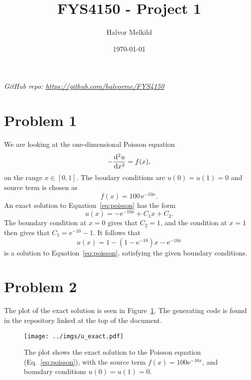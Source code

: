 \documentclass[english,notitlepage,aps,pra,10pt]{revtex4-2}
\newcommand{\e}{\mathrm{e}}
\begin{document}
\title{FYS4150 - Project 1}      %
\author{Halvor Melkild}          %
\date{\today}                             %
\noaffiliation                            %


\maketitle

\textit{GitHub repo: \href{https://github.com/halvorme/FYS4150/}{https://github.com/halvorme/FYS4150}}

\section*{Problem 1}

We are looking at the one-dimensional Poisson equation 
\begin{equation}
    -\dv[2]{u}{x} = f(x),
    \label{eq:poisson}
\end{equation}
on the range $x \in [0,1]$. The boudary conditions are $u(0) = u(1) = 0$ and source term is chosen as 
\begin{equation}
    f(x) = 100\, \e^{-10x}.
\end{equation}
An exact solution to Equation~\ref{eq:poisson} has the form 
\begin{equation}
    u(x) = -\e^{-10x} + C_1 x + C_2.
\end{equation}
The boundary condition at $x=0$ gives that $C_2 = 1$, and the condition at $x=1$ then gives that $C_1 = \e^{-10} - 1$. It follows that 
\begin{equation}
    u(x) = 1 - (1-\e^{-10})x - \e^{-10x} 
\end{equation}
is a solution to Equation~\ref{eq:poisson}, satisfying the given boundary conditions.


\section*{Problem 2}

The plot of the exact solution is seen in Figure~\ref{fig:uExact}. The generating code is found in the repository linked at the top of the document.

\begin{figure}%
    \begin{center}
        \texttt{[image: ../imgs/u\_exact.pdf]}
        \caption{The plot shows the exact solution to the Poisson equation (Eq.~\ref{eq:poisson}), with the source term $f(x) = 100 \e^{-10x}$, and boundary conditions $u(0)=u(1)=0$.}
        \label{fig:uExact}     
    \end{center}
\end{figure}
\end{document}
